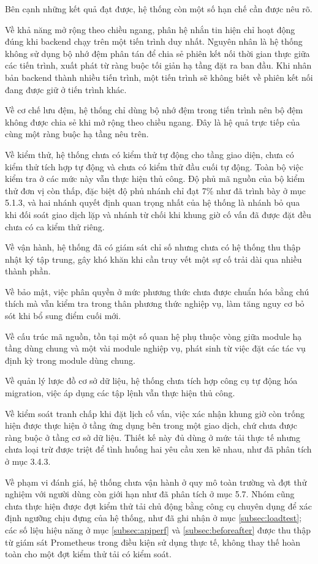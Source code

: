 \documentclass[12pt,a4paper,oneside]{report}
\begin{document}
Bên cạnh những kết quả đạt được, hệ thống còn một số hạn chế cần được nêu rõ.

Về khả năng mở rộng theo chiều ngang, phân hệ nhắn tin hiện chỉ hoạt động đúng khi backend chạy trên một tiến trình duy nhất. Nguyên nhân là hệ thống không sử dụng bộ nhớ đệm phân tán để chia sẻ phiên kết nối thời gian thực giữa các tiến trình, xuất phát từ ràng buộc tối giản hạ tầng đặt ra ban đầu. Khi nhân bản backend thành nhiều tiến trình, một tiến trình sẽ không biết về phiên kết nối đang được giữ ở tiến trình khác.

Về cơ chế lưu đệm, hệ thống chỉ dùng bộ nhớ đệm trong tiến trình nên bộ đệm không được chia sẻ khi mở rộng theo chiều ngang. Đây là hệ quả trực tiếp của cùng một ràng buộc hạ tầng nêu trên.

Về kiểm thử, hệ thống chưa có kiểm thử tự động cho tầng giao diện, chưa có kiểm thử tích hợp tự động và chưa có kiểm thử đầu cuối tự động. Toàn bộ việc kiểm tra ở các mức này vẫn thực hiện thủ công. Độ phủ mã nguồn của bộ kiểm thử đơn vị còn thấp, đặc biệt độ phủ nhánh chỉ đạt 7\% như đã trình bày ở mục 5.1.3, và hai nhánh quyết định quan trọng nhất của hệ thống là nhánh bỏ qua khi đối soát giao dịch lặp và nhánh từ chối khi khung giờ cố vấn đã được đặt đều chưa có ca kiểm thử riêng.

Về vận hành, hệ thống đã có giám sát chỉ số nhưng chưa có hệ thống thu thập nhật ký tập trung, gây khó khăn khi cần truy vết một sự cố trải dài qua nhiều thành phần.

Về bảo mật, việc phân quyền ở mức phương thức chưa được chuẩn hóa bằng chú thích mà vẫn kiểm tra trong thân phương thức nghiệp vụ, làm tăng nguy cơ bỏ sót khi bổ sung điểm cuối mới.

Về cấu trúc mã nguồn, tồn tại một số quan hệ phụ thuộc vòng giữa module hạ tầng dùng chung và một vài module nghiệp vụ, phát sinh từ việc đặt các tác vụ định kỳ trong module dùng chung.

Về quản lý lược đồ cơ sở dữ liệu, hệ thống chưa tích hợp công cụ tự động hóa migration, việc áp dụng các tập lệnh vẫn thực hiện thủ công.

Về kiểm soát tranh chấp khi đặt lịch cố vấn, việc xác nhận khung giờ còn trống hiện được thực hiện ở tầng ứng dụng bên trong một giao dịch, chứ chưa được ràng buộc ở tầng cơ sở dữ liệu. Thiết kế này đủ dùng ở mức tải thực tế nhưng chưa loại trừ được triệt để tình huống hai yêu cầu xen kẽ nhau, như đã phân tích ở mục 3.4.3.

Về phạm vi đánh giá, hệ thống chưa vận hành ở quy mô toàn trường và đợt thử nghiệm với người dùng còn giới hạn như đã phân tích ở mục 5.7. Nhóm cũng chưa thực hiện được đợt kiểm thử tải chủ động bằng công cụ chuyên dụng để xác định ngưỡng chịu đựng của hệ thống, như đã ghi nhận ở mục \ref{subsec:loadtest}; các số liệu hiệu năng ở mục \ref{subsec:apiperf} và \ref{subsec:beforeafter} được thu thập từ giám sát Prometheus trong điều kiện sử dụng thực tế, không thay thế hoàn toàn cho một đợt kiểm thử tải có kiểm soát.
\end{document}
